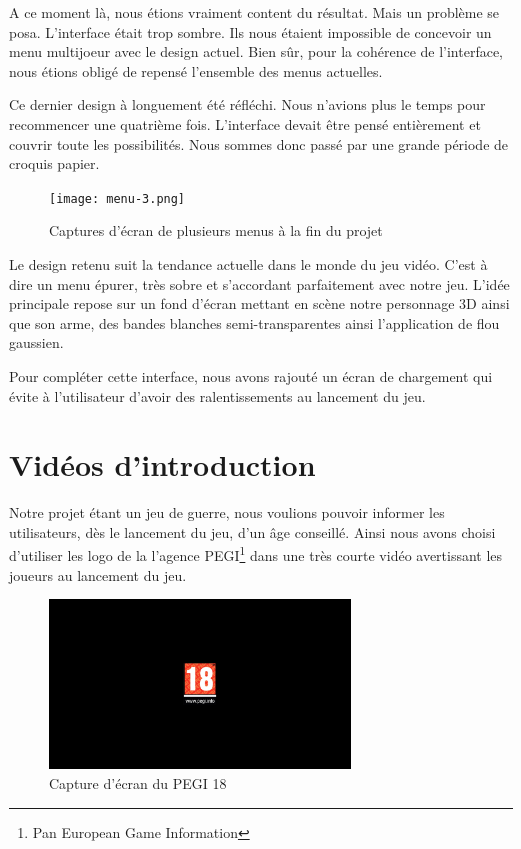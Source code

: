 \documentclass[11pt]{report}
\begin{document}
A ce moment là, nous étions vraiment content du résultat. Mais un problème se posa. L'interface était trop sombre. Ils nous étaient impossible de concevoir un menu multijoeur avec le design actuel. Bien sûr, pour la cohérence de l'interface, nous étions obligé de repensé l'ensemble des menus actuelles.

Ce dernier design à longuement été réfléchi. Nous n'avions plus le temps pour recommencer une quatrième fois. L'interface devait être pensé entièrement et couvrir toute les possibilités. Nous sommes donc passé par une grande période de croquis papier.

\begin{figure}[htbp]
\centering
\texttt{[image: menu-3.png]}
\caption{Captures d'écran de plusieurs menus à la fin du projet}
\end{figure}

Le design retenu suit la tendance actuelle dans le monde du jeu vidéo. C'est à dire un menu épurer, très sobre et s'accordant parfaitement avec notre jeu. L'idée principale repose sur un fond d'écran mettant en scène notre personnage 3D ainsi que son arme, des bandes blanches semi-transparentes ainsi l'application de flou gaussien.

Pour compléter cette interface, nous avons rajouté un écran de chargement qui évite à l'utilisateur d'avoir des ralentissements au lancement du jeu.

\section{Vidéos d'introduction}

Notre projet étant un jeu de guerre, nous voulions pouvoir informer les utilisateurs, dès le lancement du jeu, d'un âge conseillé. Ainsi nous avons choisi d'utiliser les logo de la l'agence PEGI\footnote{Pan European Game Information} dans une très courte vidéo avertissant les joueurs au lancement du jeu.

\begin{figure}[htbp]
\centering
\includegraphics[width=8cm]{pegi18.png}
\caption{Capture d'écran du PEGI 18}
\end{figure}
\end{document}
